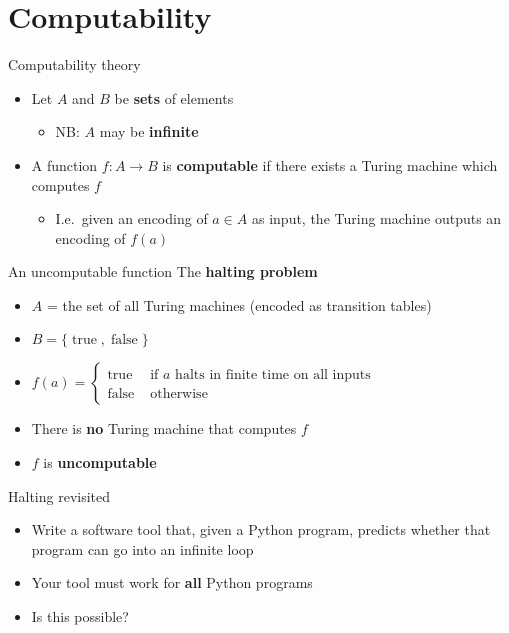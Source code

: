 \part{Computability}
\frame{\partpage}

\begin{frame}{Computability theory}
	\begin{itemize}
		\pause\item Let $A$ and $B$ be \textbf{sets} of elements
			\begin{itemize}
				\pause\item NB: $A$ may be \textbf{infinite}
			\end{itemize}
		\pause\item A function $f : A \to B$ is \textbf{computable} if there exists a Turing machine
			which computes $f$
			\begin{itemize}
				\pause\item I.e.\ given an encoding of $a \in A$ as input, the Turing machine outputs an encoding of
					$f(a)$
			\end{itemize}
	\end{itemize}
\end{frame}

\begin{frame}{An uncomputable function}
	The \textbf{halting problem}
	\begin{itemize}
		\pause\item $A$ = the set of all Turing machines (encoded as transition tables)
		\pause\item $B = \{ \operatorname{true}, \operatorname{false} \}$
		\pause\item $f(a) = \begin{cases}
			\operatorname{true} & \text{ if $a$ halts in finite time on all inputs} \\
			\operatorname{false} & \text{ otherwise}
		\end{cases}$
		\pause\item There is \textbf{no} Turing machine that computes $f$
		\pause\item $f$ is \textbf{uncomputable}
	\end{itemize}
\end{frame}

\begin{frame}{Halting revisited}
	\begin{itemize}
		\pause\item Write a software tool that, given a Python program, predicts whether that program can go into an infinite loop
		\pause\item Your tool must work for \textbf{all} Python programs
		\pause\item Is this possible?
	\end{itemize}
\end{frame}
